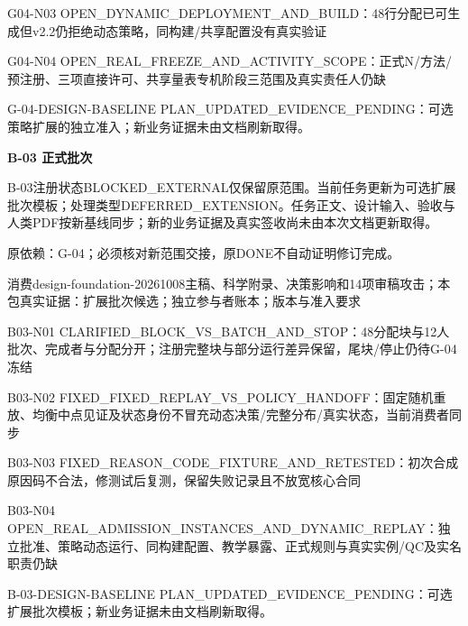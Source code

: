 \documentclass[11pt,a4paper]{article}
\newcommand{\reviewsection}[1]{\par\Needspace{5\baselineskip}\vspace{10pt}\begin{center}{\titlelatin\titlecjk\bfseries\fontsize{14}{20}\selectfont #1}\end{center}}
\begin{document}
G04-\allowbreak{}N03 OPEN\_\allowbreak{}DYNAMIC\_\allowbreak{}DEPLOYMENT\_\allowbreak{}AND\_\allowbreak{}BUILD：48行分配已可生成但v2.2仍拒绝动态策略，同构建/\allowbreak{}共享配置没有真实验证


G04-\allowbreak{}N04 OPEN\_\allowbreak{}REAL\_\allowbreak{}FREEZE\_\allowbreak{}AND\_\allowbreak{}ACTIVITY\_\allowbreak{}SCOPE：正式N/\allowbreak{}方法/\allowbreak{}预注册、三项直接许可、共享量表专机阶段三范围及真实责任人仍缺


G-\allowbreak{}04-\allowbreak{}DESIGN-\allowbreak{}BASELINE PLAN\_\allowbreak{}UPDATED\_\allowbreak{}EVIDENCE\_\allowbreak{}PENDING：可选策略扩展的独立准入；新业务证据未由文档刷新取得。


\reviewsection{B-\allowbreak{}03 正式批次}
B-\allowbreak{}03注册状态BLOCKED\_\allowbreak{}EXTERNAL仅保留原范围。当前任务更新为可选扩展批次模板；处理类型DEFERRED\_\allowbreak{}EXTENSION。任务正文、设计输入、验收与人类PDF按新基线同步；新的业务证据及真实签收尚未由本次文档更新取得。


原依赖：G-\allowbreak{}04；必须核对新范围交接，原DONE不自动证明修订完成。


消费design-\allowbreak{}foundation-\allowbreak{}20261008主稿、科学附录、决策影响和14项审稿攻击；本包真实证据：扩展批次候选；独立参与者账本；版本与准入要求


B03-\allowbreak{}N01 CLARIFIED\_\allowbreak{}BLOCK\_\allowbreak{}VS\_\allowbreak{}BATCH\_\allowbreak{}AND\_\allowbreak{}STOP：48分配块与12人批次、完成者与分配分开；注册完整块与部分运行差异保留，尾块/\allowbreak{}停止仍待G-\allowbreak{}04冻结


B03-\allowbreak{}N02 FIXED\_\allowbreak{}FIXED\_\allowbreak{}REPLAY\_\allowbreak{}VS\_\allowbreak{}POLICY\_\allowbreak{}HANDOFF：固定随机重放、均衡中点见证及状态身份不冒充动态决策/\allowbreak{}完整分布/\allowbreak{}真实状态，当前消费者同步


B03-\allowbreak{}N03 FIXED\_\allowbreak{}REASON\_\allowbreak{}CODE\_\allowbreak{}FIXTURE\_\allowbreak{}AND\_\allowbreak{}RETESTED：初次合成原因码不合法，修测试后复测，保留失败记录且不放宽核心合同


B03-\allowbreak{}N04 OPEN\_\allowbreak{}REAL\_\allowbreak{}ADMISSION\_\allowbreak{}INSTANCES\_\allowbreak{}AND\_\allowbreak{}DYNAMIC\_\allowbreak{}REPLAY：独立批准、策略动态运行、同构建配置、教学暴露、正式规则与真实实例/\allowbreak{}QC及实名职责仍缺


B-\allowbreak{}03-\allowbreak{}DESIGN-\allowbreak{}BASELINE PLAN\_\allowbreak{}UPDATED\_\allowbreak{}EVIDENCE\_\allowbreak{}PENDING：可选扩展批次模板；新业务证据未由文档刷新取得。
\end{document}
